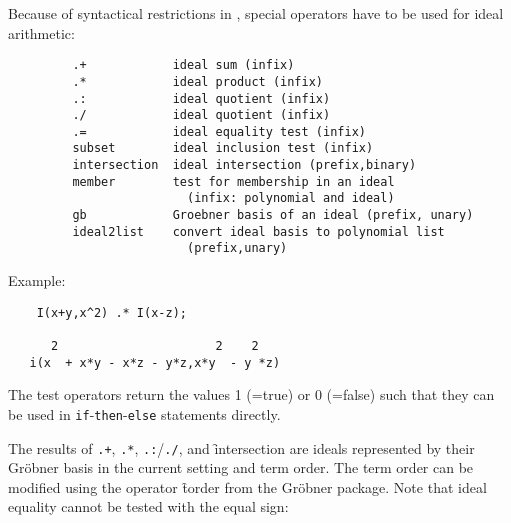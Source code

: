 Because of syntactical restrictions in \REDUCE, special operators
have to be used for ideal arithmetic: 
\hypertarget{operator:IDEALSUM}{}
\hypertarget{operator:IDEALPRODUCT}{}
\hypertarget{operator:IDEALQUOTIENT}{}
\hypertarget{operator:IDEALQUOTIENTALT}{}
\hypertarget{operator:IDEALEQUALITY}{}
\hypertarget{operator:IDEALSUBSET}{}
\hypertarget{operator:IDEALINTERSECTION}{}
\hypertarget{operator:IDEALMEMBER}{}
\hypertarget{operator:IDEALGB}{}
\begin{verbatim}
         .+            ideal sum (infix)
         .*            ideal product (infix)
         .:            ideal quotient (infix)
         ./            ideal quotient (infix)
         .=            ideal equality test (infix)
         subset        ideal inclusion test (infix)
         intersection  ideal intersection (prefix,binary)
         member        test for membership in an ideal
                         (infix: polynomial and ideal)
         gb            Groebner basis of an ideal (prefix, unary)
         ideal2list    convert ideal basis to polynomial list 
                         (prefix,unary)
\end{verbatim}

Example:

\begin{verbatim}
    I(x+y,x^2) .* I(x-z);

      2                      2    2
   i(x  + x*y - x*z - y*z,x*y  - y *z)
\end{verbatim}

The test operators return the values 1 (=true) or 0 (=false)
such that they can be used in \REDUCE \texttt{if}-\texttt{then}-\texttt{else} statements
directly.

The results of \texttt{.+}, \texttt{.*}, \texttt{.:}/\texttt{./}, and \f{intersection} are ideals
represented by their Gr\"obner basis in the current setting and
term order. The term order can be modified using the operator
\f{torder} from the Gr\"obner package. Note that ideal equality 
cannot be tested with the \REDUCE equal sign:

